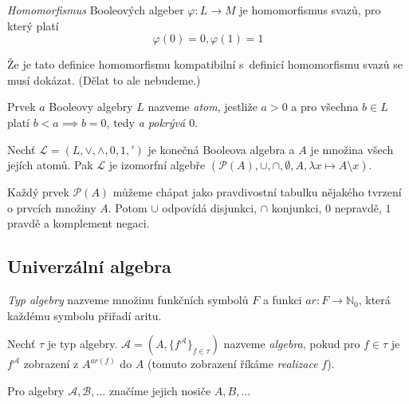 \begin{definition}[Homomorfismus]
    {\em Homomorfismus} Booleových algeber $\varphi \colon L \to M$
    je homomorfismus svazů, pro který platí
    \[
    \varphi(0) = 0, \varphi(1) = 1
    \]
\end{definition}

Že je tato definice homomorfismu kompatibilní s~definicí homomorfismu
svazů se musí dokázat. (Dělat to ale nebudeme.)

\begin{definition}[Atom]
    Prvek $a$ Booleovy algebry $L$ nazveme {\em atom}, jestliže
    $a > 0$ a pro všechna $b \in L$ platí $b < a \implies b = 0$,
    tedy {\em a pokrývá $0$}.
\end{definition}

\begin{theorem}
    Nechť $\mathcal{L} = (L, \vee, \wedge, 0, 1, {'})$
    je konečná Booleova algebra
    \linebreak
    a $A$ je množina všech jejích atomů.
    Pak $\mathcal{L}$ je izomorfní algebře
    \linebreak
    $(\mathcal{P}(A), \cup, \cap, \emptyset, A, \lambda x \mapsto A \setminus x)$.
\end{theorem}

Každý prvek $\mathcal{P}(A)$ můžeme chápat jako pravdivostní tabulku
nějakého tvrzení o prvcích množiny $A$. Potom $\cup$ odpovídá
disjunkci, $\cap$ konjunkci, $0$ nepravdě, $1$ pravdě a komplement
negaci.

\subsection{Univerzální algebra}

\begin{definition}
    {\em Typ algebry} nazveme množinu funkčních symbolů $F$ a
    funkci $ar : F \to \mathbb{N}_0$, která každému symbolu přiřadí aritu.
\end{definition}

\begin{definition}[Algebra]
    Nechť $\tau$ je typ algebry.
    $\mathcal{A} = (A, \{ f^\mathcal{A} \}_{f \in \tau})$
    nazveme {\em algebra}, pokud pro $f \in \tau$ je
    $f^\mathcal{A}$ zobrazení z $A^{ar(f)}$ do $A$ (tomuto zobrazení
    říkáme {\em realizace} $f$).
\end{definition}

Pro algebry $\mathcal{A}, \mathcal{B}, \ldots$ značíme jejich nosiče $A,
B, \ldots$


